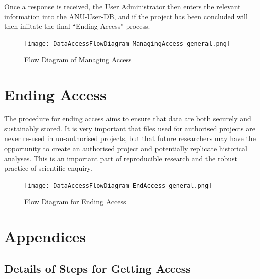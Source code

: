 \documentclass[a4paper]{article}
\begin{document}
Once a response is received, the User Administrator then enters the relevant information into the ANU-User-DB, and if the project has been concluded will then iniitate the final ``Ending Access'' process.


\begin{figure}[!h]
\centering
\texttt{[image: DataAccessFlowDiagram-ManagingAccess-general.png]}
\caption{Flow Diagram of Managing Access}
\label{fig:DataAccessFlowDiagram-ManagingAccess}
\end{figure}
\clearpage
\section{Ending Access}
\label{sec-4}

The procedure for ending access aims to ensure that data are both securely and sustainably stored.  It is very important that files used for authorised projects are never re-used in un-authorised projects, but that future researchers may have the opportunity to create an authorised project and potentially replicate historical analyses.  This is an important part of reproducible research and the robust practice of scientific enquiry.


\begin{figure}[!h]
\centering
\texttt{[image: DataAccessFlowDiagram-EndAccess-general.png]}
\caption{Flow Diagram for Ending Access}
\label{fig:DataAccessFlowDiagram-EndAccess}
\end{figure}
\clearpage
\section{Appendices}
\label{sec-5}
\subsection{Details of Steps for Getting Access}
\label{sec-5-1}
\end{document}
